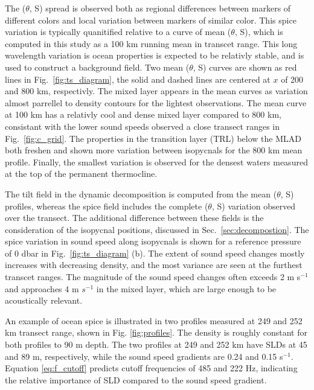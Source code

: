 \documentclass[preprint,NumberedRefs]{JASA}
\begin{document}
The ($\theta$, S) spread is observed both as regional differences between markers of different colors and local variation between markers of similar color. This spice variation is typically quanitified relative to a curve of mean ($\theta$, S), which is computed in this study as a 100 km running mean in transcet range. This long wavelength variation is ocean properties is expected to be relativly stable, and is used to construct a background field\cite{dzieciuch2004}. Two mean ($\theta$, S) curves are shown as red lines in Fig.~\ref{fig:ts_diagram}, the solid and dashed lines are centered at $x$ of 200 and 800 km, respectivly. The mixed layer appears in the mean curves as variation almost parrellel to density contours for the lightest observations. The mean curve at 100 km has a relativly cool and dense mixed layer compared to 800 km, consistant with the lower sound speeds observed a close transect ranges in Fig.~\ref{fig:c_grid}. The properties in the transition layer (TRL) below the MLAD both freshen and shown more variation between isopycnals for the 800 km mean profile. Finally, the smallest variation is observed for the densest waters measured at the top of the permanent thermocline\cite{cole2010seasonal}.

The tilt field in the dynamic decomposition is computed from the mean ($\theta$, S) profiles, whereas the spice field includes the complete ($\theta$, S) variation observed over the transect. The additional difference between these fields is the consideration of the isopycnal positions, discussed in Sec.~\ref{sec:decompostion}. The spice variation in sound speed along isopycnals is shown for a reference pressure of 0 dbar in Fig.~\ref{fig:ts_diagram} (b). The extent of sound speed changes mostly increases with decreasing density, and the most variance are seen at the furthest transcet ranges. The magnitude of the sound speed changes often exceeds 2 m s$^{-1}$ and approaches 4 m $s^{-1}$ in the mixed layer, which are large enough to be acoustically relevant.

An example of ocean spice is illustrated in two profiles measured at 249 and 252 km transect range, shown in Fig. \ref{fig:profiles}. The density is roughly constant for both profiles to 90 m depth. The two profiles at 249 and 252 km have SLDs at 45 and 89 m, respectively, while the sound speed gradients are 0.24 and 0.15 s$^{-1}$. Equation \eqref{eq:f_cutoff} predicts cutoff frequencies of 485 and 222 Hz, indicating the relative importance of SLD compared to the sound speed gradient.
\end{document}
